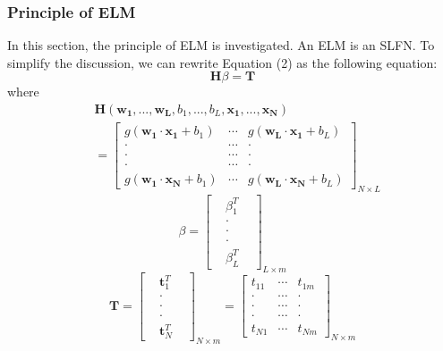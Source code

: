 \documentclass[a4paper, 14pt]{extarticle}
\begin{document}
\subsubsection{Principle of ELM} 
\par In this section, the principle of ELM is investigated. An ELM is an SLFN. To simplify the discussion, we can rewrite Equation (2) as the following equation\cite{huang2006extreme}:
\begin{equation}
    \mathbf{H}\beta = \mathbf{T}
\end{equation}
where 
\begin{equation}
\begin{split}
    &\mathbf{H}(\mathbf{w_1, ..., w_L},  b_1, ..., b_L, \mathbf{x_1, ..., x_N})\\&=
    \begin{bmatrix}
    g(\mathbf{w_1 \cdot x_1} + b_1) & \cdots & g(\mathbf{w_L \cdot x_1} + b_L)\\
    \cdot & \cdots & \cdot\\
    \cdot & \cdots & \cdot\\
    \cdot & \cdots & \cdot\\
    g(\mathbf{w_1 \cdot x_N} + b_1) & \cdots & g(\mathbf{w_L \cdot x_N} + b_L)
    \end{bmatrix}_{N\times L}
\end{split}
\end{equation}
\newline
\begin{equation}
    \beta =
    \begin{bmatrix}
    &\beta_1^T&\\
    &\cdot&\\
    &\cdot&\\
    &\cdot&\\
    &\beta_L^T&
    \end{bmatrix}_{L \times m}
\end{equation}
\newline
\begin{equation}
    \mathbf{T} =
    \begin{bmatrix}
    &\mathbf{t}_1^T&\\
    &\cdot&\\
    &\cdot&\\
    &\cdot&\\
    &\mathbf{t}_N^T&
    \end{bmatrix}_{N \times m}
    =
    \begin{bmatrix}
    t_{11} & \cdots & t_{1m}\\
    \cdot & \cdots & \cdot\\
    \cdot & \cdots & \cdot\\
    \cdot & \cdots & \cdot\\
    t_{N1} & \cdots & t_{Nm}
    \end{bmatrix}_{N \times m}
\end{equation}
\end{document}

